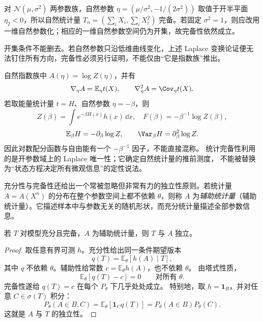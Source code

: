\begin{workedexample}[正态两参数族的完备性]
对 $\mathcal N(\mu,\sigma^2)$ 两参数族，自然参数 $\eta=(\mu/\sigma^2,-1/(2\sigma^2))$ 取值于开半平面 $\eta_2<0$，所以自然统计量 $T_n=(\sum_i X_i,\sum_i X_i^2)$ 完备。若固定 $\sigma^2=1$，则应改用一维自然参数化；相应的一维自然参数空间仍为开集，故完备性依然成立。
\end{workedexample}

\begin{note}[曲线参数域须另证完备性]
开集条件不能删去。若自然参数只沿低维曲线变化，上述 Laplace 变换论证便无法钉住所有方向，完备性必须另行证明，不能仅由“它是指数族”推出。
\end{note}


\begin{note}[配分函数的统计含义]
自然指数族中 $A(\eta)=\log Z(\eta)$，并有
\[
 \nabla_\eta A=\mathbb E_\eta t(X),\qquad
 \nabla_\eta^2A=\Cov_\eta t(X).
\]
若取能量统计量 $t=H$、自然参数 $\eta=-\beta$，则
\[
 Z(\beta)=\int e^{-\beta H(x)}h(x)\,\dd x,\quad
 F(\beta)=-\beta^{-1}\log Z(\beta),
\]
\[
 \mathbb E_\beta H=-\partial_\beta\log Z,\qquad
 \Var_\beta H=\partial_\beta^2\log Z.
\]
因此对数配分函数与自由能有一个 $-\beta^{-1}$ 因子，不能直接混称。
统计完备性利用的是开参数域上的 Laplace 唯一性；它确定自然统计量的推前测度，
不能被替换为“状态方程决定所有微观信息”的定性说法。
\end{note}

\begin{definition}[辅助统计量]
充分性与完备性还给出一个常被忽略但非常有力的独立性原则。若统计量 $A=A(X^n)$ 的分布在整个参数空间上都不依赖 $\theta$，则称 $A$ 为\emph{辅助统计量}（辅助统计量）。它描述样本中与参数无关的随机形状，而充分统计量描述全部参数信息。
\end{definition}

\begin{theorem}[Basu 定理]
若 $T$ 对模型充分且完备，$A$ 为辅助统计量，则 $T$ 与 $A$ 独立。
\end{theorem}


\begin{proof}
取任意有界可测 $h$。充分性给出同一条件期望版本
\[
 q(T)=\mathbb E_\theta[h(A)\mid T],
\]
其中 $q$ 不依赖 $\theta$。辅助性给常数 $c=\mathbb E_\theta h(A)$，也不依赖 $\theta$。
由塔式性质，
\[
 \mathbb E_\theta[q(T)-c]=0\qquad\text{对所有 }\theta.
\]
完备性遂给 $q(T)=c$ 在每个 $P_\theta$ 下几乎处处成立。
特别地，取 $h=\mathbf1_B$，并对任意 $C\in\sigma(T)$ 积分：
\[
 P_\theta(A\in B,C)
 =\mathbb E_\theta[\mathbf1_C q(T)]
 =P_\theta(A\in B)P_\theta(C).
\]
这就是 $A$ 与 $T$ 的独立性。
\end{proof}

